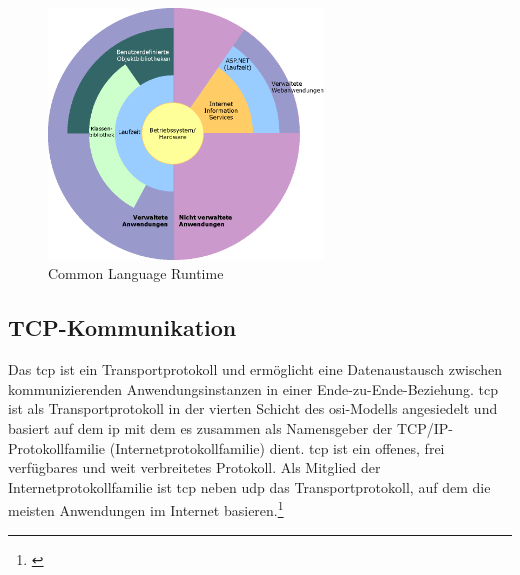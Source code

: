 \begin{figure}[h]
	\centering
	\includegraphics[width=0.65\textwidth]{images/technische_grundlagen/clr.png}
	\caption{Common Language Runtime \cite{Microsoft.Overviewof}}
	\label{fig:clr}
\end{figure}

\subsection{TCP-Kommunikation}
Das \gls{tcp} ist ein Transportprotokoll und ermöglicht eine Datenaustausch zwischen kommunizierenden Anwendungsinstanzen in einer Ende-zu-Ende-Beziehung. \gls{tcp} ist als Transportprotokoll in der vierten Schicht des \gls{osi}-Modells angesiedelt und basiert auf dem \gls{ip} mit dem es zusammen als Namensgeber der TCP/IP-Protokollfamilie (Internetprotokollfamilie) dient.
\gls{tcp} ist ein offenes, frei verfügbares und weit verbreitetes Protokoll. Als Mitglied der Internetprotokollfamilie ist \gls{tcp} neben \gls{udp} das Transportprotokoll, auf dem die meisten Anwendungen im Internet basieren.\footnote{\citep[vgl.][Grundkurs Datenkommunikation, Seite 189]{Mandl.GrundkursDatenkommunikation}\label{note43}}
